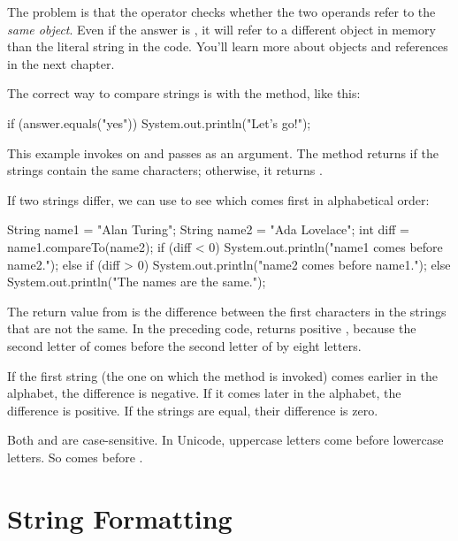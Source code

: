 The problem is that the \java{==} operator checks whether the two operands refer to the {\em same object}.
Even if the answer is , it will refer to a different object in memory than the literal string  in the code.
You'll learn more about objects and references in the next chapter.

The correct way to compare strings is with the  method, like this:

\begin{code}
if (answer.equals("yes")) {
    System.out.println("Let's go!");
}
\end{code}

This example invokes  on  and passes  as an argument.
The  method returns  if the strings contain the same characters; otherwise, it returns .


If two strings differ, we can use  to see which comes first in alphabetical order:

\begin{code}
String name1 = "Alan Turing";
String name2 = "Ada Lovelace";
int diff = name1.compareTo(name2);
if (diff < 0) {
    System.out.println("name1 comes before name2.");
} else if (diff > 0) {
    System.out.println("name2 comes before name1.");
} else {
    System.out.println("The names are the same.");
}
\end{code}

The return value from  is the difference between the first characters in the strings that are not the same.
In the preceding code,  returns positive , because the second letter of  comes before the second letter of  by eight letters.

If the first string (the one on which the method is invoked) comes earlier in the alphabet, the difference is negative.
If it comes later in the alphabet, the difference is positive.
If the strings are equal, their difference is zero.


Both  and  are case-sensitive.
In Unicode, uppercase letters come before lowercase letters.
So  comes before .


\section{String Formatting}

